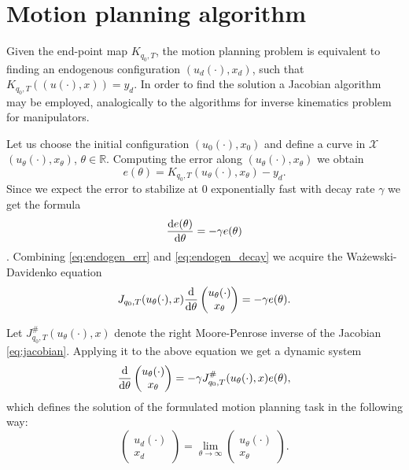\section{Motion planning algorithm}
Given the end-point map $K_{q_0, T}$, the motion planning problem is equivalent to finding an endogenous
configuration $(u_d(\cdot), x_d)$, such that $K_{q_0, T}((u(\cdot), x))=y_d$. In order to find the
solution a Jacobian algorithm may be employed, analogically to the algorithms
for inverse kinematics problem for manipulators. 

Let us choose the initial configuration $(u_0(\cdot), x_0)$ and
define a curve in $\mathcal{X}$ $(u_\theta(\cdot), x_\theta)$, $\theta \in \mathbb{R}$.
Computing the error along $(u_\theta(\cdot), x_\theta)$ we obtain
\begin{equation}
\label{eq:endogen_err}
e(\theta)=K_{q_0, T}(u_\theta(\cdot), x_\theta)-y_d.
\end{equation}
Since we expect the error to stabilize at $0$ exponentially fast with decay rate
$\gamma$ we get the formula
\begin{equation}
\label{eq:endogen_decay}
\frac{\mathrm{d} e(\theta)}{\mathrm{d} \theta}=-\gamma e(\theta)
\end{equation}.
Combining \eqref{eq:endogen_err} and \eqref{eq:endogen_decay} we acquire the Ważewski-Davidenko equation
\begin{equation}
J_{q_0, T}(u_\theta(\cdot), x)\dfrac{\mathrm{d}}{\mathrm{d} \theta}\begin{pmatrix}
u_\theta(\cdot)\\ x_\theta
\end{pmatrix}=-\gamma e(\theta).
\end{equation}

Let $J^\#_{q_0, T}(u_\theta(\cdot), x)$ denote the right Moore-Penrose inverse
of the Jacobian \eqref{eq:jacobian}. Applying it to the above equation we get a dynamic system
\begin{equation}
\dfrac{\mathrm{d}}{\mathrm{d} \theta}\begin{pmatrix}
u_\theta(\cdot)\\ x_\theta
\end{pmatrix}=-\gamma J^\#_{q_0, T}(u_\theta(\cdot), x) e(\theta),
\end{equation}
which defines the solution of the formulated motion planning task in the following way:
\begin{equation}
\begin{pmatrix}
u_d(\cdot)\\ x_d
\end{pmatrix}=\lim_{\theta\rightarrow\infty}\begin{pmatrix}
u_\theta(\cdot)\\ x_\theta
\end{pmatrix}.
\end{equation}

